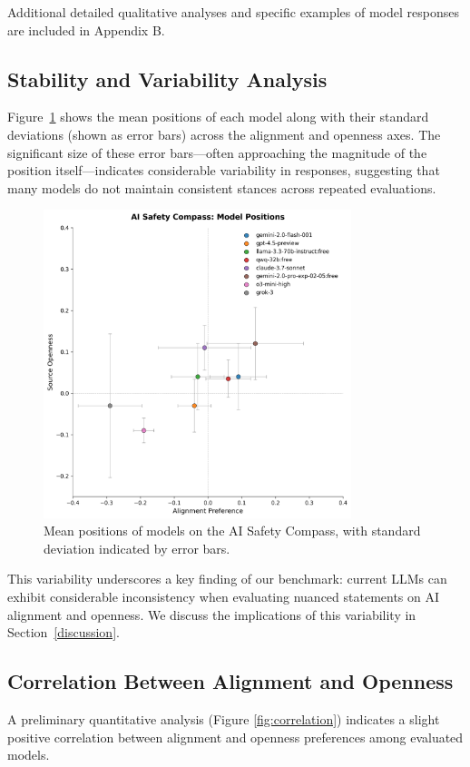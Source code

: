 Additional detailed qualitative analyses and specific examples of model responses are included in Appendix B.

\subsection{Stability and Variability Analysis}

Figure~\ref{fig:compass_variance} shows the mean positions of each model along with their standard deviations (shown as error bars) across the alignment and openness axes. The significant size of these error bars—often approaching the magnitude of the position itself—indicates considerable variability in responses, suggesting that many models do not maintain consistent stances across repeated evaluations.

\begin{figure}[htbp]
    \centering
    \includegraphics[width=0.8\textwidth]{figures/compass_with_error_bars.png}
    \caption{Mean positions of models on the AI Safety Compass, with standard deviation indicated by error bars.}
    \label{fig:compass_variance}
\end{figure}

This variability underscores a key finding of our benchmark: current LLMs can exhibit considerable inconsistency when evaluating nuanced statements on AI alignment and openness. We discuss the implications of this variability in Section~\ref{discussion}.


\subsection{Correlation Between Alignment and Openness}
A preliminary quantitative analysis (Figure \ref{fig:correlation}) indicates a slight positive correlation between alignment and openness preferences among evaluated models.

